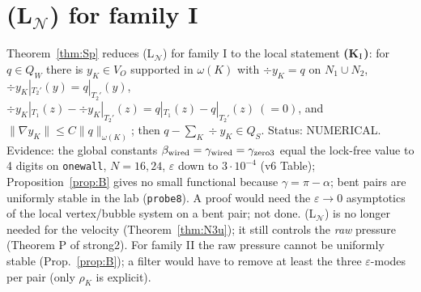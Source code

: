\documentclass[11pt]{article}
\theoremstyle{remark}
\newcommand{\VO}{V_O}
\newcommand{\norm}[1]{\|#1\|}
\newcommand{\Nset}{\mathcal N}
\begin{document}
\section{(L$_\Nset$) for family I}\label{sec:LN}
Theorem~\ref{thm:Sp} reduces (L$_\Nset$) for family I to the local statement
\textbf{(K$_{\rm I}$)}: for $q\in Q_W$ there is $y_K\in\VO$ supported in $\omega(K)$ with $\div y_K=q$ on $N_1\cup N_2$, $\div y_K|_{T_2'}(y)=q|_{T_2'}(y)$,
$\div y_K|_{T_1}(z)-\div y_K|_{T_2'}(z)=q|_{T_1}(z)-q|_{T_2'}(z)\ (=0)$, and $\norm{\nabla y_K}\le C\norm q_{\omega(K)}$; then $q-\sum_K\div y_K\in Q_S$.
Status: NUMERICAL. Evidence: the global constants $\beta_{\rm wired}=\gamma_{\rm wired}=\gamma_{\rm zero3}$ equal the lock-free value to 4 digits on \texttt{onewall},
$N=16,24$, $\varepsilon$ down to $3\cdot10^{-4}$ (v6 Table); Proposition~\ref{prop:B} gives no small functional because $\gamma=\pi-\alpha$; bent pairs are
uniformly stable in the lab (\texttt{probe8}). A proof would need the $\varepsilon\to0$ asymptotics of the local vertex/bubble system on a bent pair; not done.
(L$_\Nset$) is no longer needed for the velocity (Theorem~\ref{thm:N3u}); it still controls the \emph{raw} pressure (Theorem P of strong2). For family II the raw
pressure cannot be uniformly stable (Prop.~\ref{prop:B}); a filter would have to remove at least the three $\varepsilon$-modes per pair (only $\rho_K$ is explicit).
\end{document}
